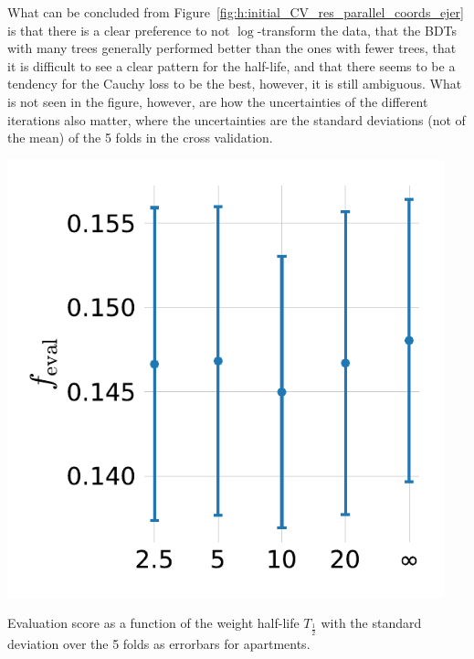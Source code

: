 What can be concluded from Figure~\ref{fig:h:initial_CV_res_parallel_coords_ejer} is that there is a clear preference to not $\log$-transform the data, that the BDTs with many trees generally performed better than the ones with fewer trees, that it is difficult to see a clear pattern for the half-life, and that there seems to be a tendency for the Cauchy loss to be the best, however, it is still ambiguous. What is not seen in the figure, however, are how the uncertainties of the different iterations also matter, where the uncertainties are the standard deviations (not of the mean) of the \num{5} folds in the cross validation.
\begin{marginfigure}
  \centerfloat
  \includegraphics[width=0.95\textwidth, trim=0 0 0 0, clip]{figures/housing/Ejerlejlighed_v19_cut_all_Ncols_all_MAD_gridsearch_half.pdf}
  \caption[Initial HPO Results for the Weight Half-life $T_{\frac{1}{2}}$]
          {Evaluation score as a function of the weight half-life $T_{\frac{1}{2}}$ with the standard deviation over the \num{5} folds as errorbars for apartments.}
  \label{fig:h:hpo_gridsearch_objective}
\end{marginfigure}

